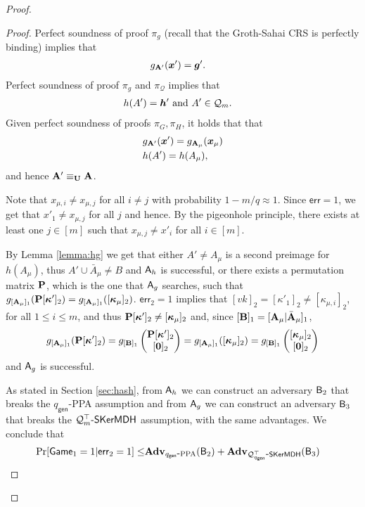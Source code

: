 \begin{proof}
\begin{proof}
Perfect soundness of proof $\pi_g$  (recall that the Groth-Sahai CRS is perfectly binding)  implies that
\begin{align*}
&g_{\matr{A}'}(\vecb{x}')=\vecb{g}'. %
\end{align*}
Perfect soundness of proof $\pi_g$ and $\pi_{\mathcal{Q}}$ implies that
\begin{align*}
&h(A')=\vecb{h}'\text{ and } A'\in \mathcal{Q}_m.%
\end{align*}
Given perfect soundness of proofs $\pi_G,\pi_H$, it holds that that
\begin{align*}
&g_{\matr{A}'}(\vecb{x}')=g_{\matr{A}_\mu}(\vecb{x}_\mu)%
\\
&h(A')=h(A_\mu), %
\end{align*}
and hence $\mathbf{{A}}'\equiv_{\mathbf{{U}}} \mathbf{{A}}$. %

Note that $x_{\mu,i}\neq x_{\mu,j}$ for all $i\neq j$ with probability $1-m/q\approx 1$. Since $\mathsf{err}=1$, we get that $x'_1\neq x_{\mu,j}$ for all $j$ and hence. By the pigeonhole principle, there exists at least one $j\in[m]$ such that $x_{\mu,j}\neq x'_i$ for all $i\in[m]$.

By Lemma \ref{lemma:hg} we get that either $A'\neq {A}_\mu$ is a second preimage for $h(A_\mu)$, thus $A'\cup\bar{A}_\mu\neq B$ and $\mathsf{A}_h$ is successful, or there exists a permutation matrix $\mathbf{{P}}$, which is the one that $\mathsf{A}_g$ searches, such that $g_{[\mathbf{{A}}_\mu]_1}(\mathbf{{P}}[{\boldsymbol{\kappa}}']_2)=g_{[\mathbf{{A}}_\mu]_1}([{\boldsymbol{\kappa}}_\mu]_2)$. $\mathsf{err}_2=1$ implies that $[vk]_2=[\kappa'_1]_2\neq[\kappa_{\mu,i}]_2$, for all $1\leq i\leq m$, and thus $\mathbf{{P}}[{\boldsymbol{\kappa}}']_2\neq [{\boldsymbol{\kappa}}_\mu]_2$ and, since $[\mathbf{{B}}]_1=[\mathbf{{A}}_\mu|\bar{\mathbf{{A}}}_\mu]_1$,
$$
g_{[\mathbf{{A}}_\mu]_1}(\mathbf{{P}}[{\boldsymbol{\kappa}}']_2)=
g_{[\mathbf{{B}}]_1}\left(\begin{matrix}
	{\mathbf{{P}}[{\boldsymbol{\kappa}}']_2}\\
	{[{\boldsymbol{0}}]_2}\end{matrix}\right)
=
g_{[\mathbf{{A}}_\mu]_1}([{\boldsymbol{\kappa}}_\mu]_2)
=
g_{[\mathbf{{B}}]_1}\left(\begin{matrix}
	{[{\boldsymbol{\kappa}}_\mu]_2}\\
	{[{\boldsymbol{0}}]_2}\end{matrix}\right)
$$ 
and $\mathsf{A}_g$ is successful.

As stated in Section \ref{sec:hash}, from $\mathsf{A}_h$ we can construct an adversary $\mathsf{B}_2$ that breaks the $q_\mathsf{gen}$-PPA assumption and from $\mathsf{A}_g$ we can construct an adversary $\mathsf{B}_3$ that breaks the $\mathcal{Q}^\top_m\mbox{-}\mathsf{SKerMDH}$ assumption, with the same advantages. We conclude that 
\begin{align*}
\Pr[\mathsf{Game}_1=1|\mathsf{err}_2=1] \leq & \mathbf{Adv}_{{q_\mathsf{gen}}\mbox{-}\mathrm{PPA}}(\mathsf{B}_2)+\mathbf{Adv}_{\mathcal{Q}^\top_{q_\mathsf{gen}}\mbox{-}\mathsf{SKerMDH}}(\mathsf{B}_3)
\end{align*}
\end{proof}


\end{proof}

